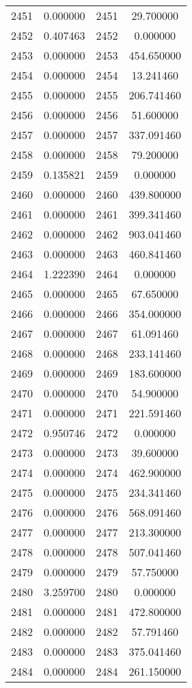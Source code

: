 \documentclass[12pt]{article}
\begin{document}
\begin{longtable}{@{}cccc@{}}
2451 & 0.000000 & 2451 & 29.700000 \\
2452 & 0.407463 & 2452 & 0.000000 \\
2453 & 0.000000 & 2453 & 454.650000 \\
2454 & 0.000000 & 2454 & 13.241460 \\
2455 & 0.000000 & 2455 & 206.741460 \\
2456 & 0.000000 & 2456 & 51.600000 \\
2457 & 0.000000 & 2457 & 337.091460 \\
2458 & 0.000000 & 2458 & 79.200000 \\
2459 & 0.135821 & 2459 & 0.000000 \\
2460 & 0.000000 & 2460 & 439.800000 \\
2461 & 0.000000 & 2461 & 399.341460 \\
2462 & 0.000000 & 2462 & 903.041460 \\
2463 & 0.000000 & 2463 & 460.841460 \\
2464 & 1.222390 & 2464 & 0.000000 \\
2465 & 0.000000 & 2465 & 67.650000 \\
2466 & 0.000000 & 2466 & 354.000000 \\
2467 & 0.000000 & 2467 & 61.091460 \\
2468 & 0.000000 & 2468 & 233.141460 \\
2469 & 0.000000 & 2469 & 183.600000 \\
2470 & 0.000000 & 2470 & 54.900000 \\
2471 & 0.000000 & 2471 & 221.591460 \\
2472 & 0.950746 & 2472 & 0.000000 \\
2473 & 0.000000 & 2473 & 39.600000 \\
2474 & 0.000000 & 2474 & 462.900000 \\
2475 & 0.000000 & 2475 & 234.341460 \\
2476 & 0.000000 & 2476 & 568.091460 \\
2477 & 0.000000 & 2477 & 213.300000 \\
2478 & 0.000000 & 2478 & 507.041460 \\
2479 & 0.000000 & 2479 & 57.750000 \\
2480 & 3.259700 & 2480 & 0.000000 \\
2481 & 0.000000 & 2481 & 472.800000 \\
2482 & 0.000000 & 2482 & 57.791460 \\
2483 & 0.000000 & 2483 & 375.041460 \\
2484 & 0.000000 & 2484 & 261.150000 \\

\end{longtable}
\end{document}
